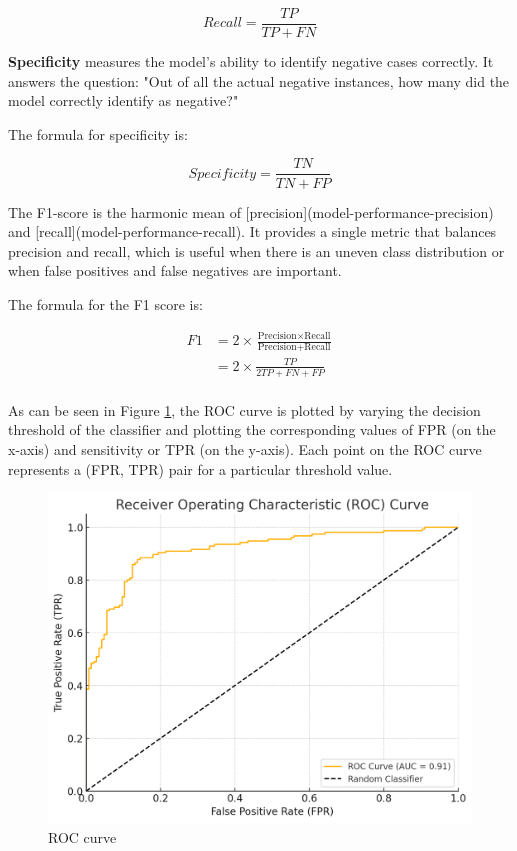 		
		$$Recall=\frac{TP}{TP + FN}$$
		
		\textbf{Specificity} measures the model's ability to identify negative cases correctly. It answers the question: "Out of all the actual negative instances, how many did the model correctly identify as negative?"
		
		The formula for specificity is:
		
		$$Specificity= \frac{TN}{TN + FP}$$
		
		The F1-score is the harmonic mean of [precision](model-performance-precision) and [recall](model-performance-recall). It provides a single metric that balances precision and recall, which is useful when there is an uneven class distribution or when false positives and false negatives are important.
		
		The formula for the F1 score is:
		
		\begin{align*}
			F1 
			&= 2 \times \frac{\text{Precision} \times \text{Recall}}{\text{Precision} + \text{Recall}}\\
			&= 2\times \frac{TP}{2TP+FN+FP}\\
		\end{align*}	
		
		\bigskip
		
		As can be seen in Figure \ref{fig:img-receiver-operator-characteristic-curve}, the ROC curve is plotted by varying the decision threshold of the classifier and plotting the corresponding values of FPR (on the x-axis) and sensitivity or TPR (on the y-axis). Each point on the ROC curve represents a (FPR, TPR) pair for a particular threshold value.
		
		\begin{figure}[H]
			\centering
			\includegraphics[width=0.7\linewidth]{img/img-receiver-operator-characteristic-curve}
			\caption{ROC curve}
			\label{fig:img-receiver-operator-characteristic-curve}
		\end{figure}
	

